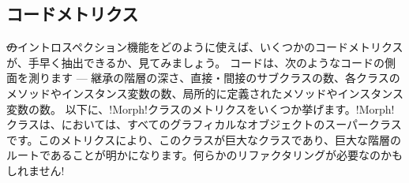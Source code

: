 \documentclass[a4paper,10pt,twoside]{book}
\begin{document}
\important{\emph{警告:}いくらこれらの機能が、とりわけ開発ツールを定義するのに便利だからと言っても、これらは通常、典型的なアプリケーションには適していません。
オブジェクトに、それが属するクラスを尋ねたり、オブジェクトがどのようなメッセージを理解するかを見つけ出そうと、それにクエリを送ること、設計上の欠陥を典型的に示すものです。なぜならそれは、カプセル化の原則を破るからです。%
開発ツールは、しかしながら、通常のアプリケーションではありません。なぜなら、開発ツールは、ソフトウェアそれ自身を対象領域とするものだからです。それで、これらのツールは、コードの内部の詳細について、深く掘り下げることを許されているのです。}


\subsection{コードメトリクス}

\st のイントロスペクション機能をどのように使えば、いくつかのコードメトリクスが、手早く抽出できるか、見てみましょう。
コードは、次のようなコードの側面を測ります --- 継承の階層の深さ、直接・間接のサブクラスの数、各クラスのメソッドやインスタンス変数の数、局所的に定義されたメソッドやインスタンス変数の数。
以下に、\ct!Morph!クラスのメトリクスをいくつか挙げます。\ct!Morph!クラスは、\pharo においては、すべてのグラフィカルなオブジェクトのスーパークラスです。このメトリクスにより、このクラスが巨大なクラスであり、巨大な階層のルートであることが明かになります。何らかのリファクタリングが必要なのかもしれません! 
\end{document}
